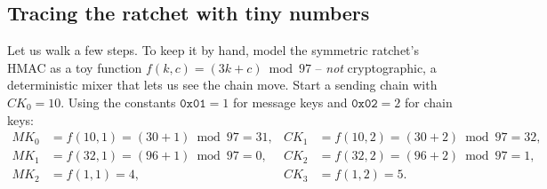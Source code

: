 \subsection{Tracing the ratchet with tiny numbers}
\label{ch27:ratchet-toy}

Let us walk a few steps. To keep it by hand, model the symmetric ratchet's HMAC as a toy function $f(k, c) = (3k + c) \bmod 97$ -- \emph{not} cryptographic, a deterministic mixer that lets us see the chain move. Start a sending chain with $CK_0 = 10$. Using the constants $\texttt{0x01}=1$ for message keys and $\texttt{0x02}=2$ for chain keys:
\begin{align*}
MK_0 &= f(10,1) = (30 + 1)\bmod 97 = 31, & CK_1 &= f(10,2) = (30+2)\bmod 97 = 32,\\
MK_1 &= f(32,1) = (96 + 1)\bmod 97 = 0, & CK_2 &= f(32,2) = (96+2)\bmod 97 = 1,\\
MK_2 &= f(1,1) = 4, & CK_3 &= f(1,2) = 5.
\end{align*}

